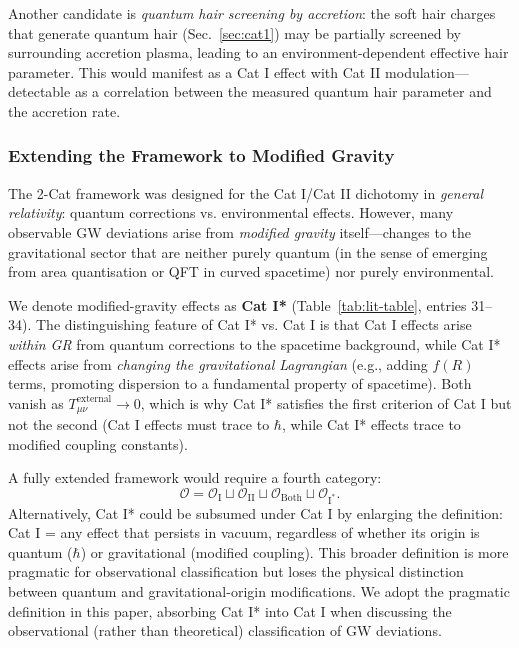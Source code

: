 \documentclass[11pt]{article}
\begin{document}
Another candidate is \emph{quantum hair screening by accretion}: the soft hair charges that generate quantum hair (Sec.~\ref{sec:cat1}) may be partially screened by surrounding accretion plasma, leading to an environment-dependent effective hair parameter. This would manifest as a Cat I effect with Cat II modulation---detectable as a correlation between the measured quantum hair parameter and the accretion rate.

\subsubsection{Extending the Framework to Modified Gravity}

The 2-Cat framework was designed for the Cat I/Cat II dichotomy in \emph{general relativity}: quantum corrections vs. environmental effects. However, many observable GW deviations arise from \emph{modified gravity} itself---changes to the gravitational sector that are neither purely quantum (in the sense of emerging from area quantisation or QFT in curved spacetime) nor purely environmental.

We denote modified-gravity effects as \textbf{Cat I*} (Table~\ref{tab:lit-table}, entries 31--34). The distinguishing feature of Cat I* vs. Cat I is that Cat I effects arise \emph{within GR} from quantum corrections to the spacetime background, while Cat I* effects arise from \emph{changing the gravitational Lagrangian} (e.g., adding $f(R)$ terms, promoting dispersion to a fundamental property of spacetime). Both vanish as $T^{\mathrm{external}}_{\mu\nu} \to 0$, which is why Cat I* satisfies the first criterion of Cat I but not the second (Cat I effects must trace to $\hbar$, while Cat I* effects trace to modified coupling constants).

A fully extended framework would require a fourth category:
\[
\mathcal{O} = \mathcal{O}_{\mathrm{I}} \sqcup \mathcal{O}_{\mathrm{II}} \sqcup \mathcal{O}_{\mathrm{Both}} \sqcup \mathcal{O}_{\mathrm{I}^*}.
\]
Alternatively, Cat I* could be subsumed under Cat I by enlarging the definition: Cat I = any effect that persists in vacuum, regardless of whether its origin is quantum ($\hbar$) or gravitational (modified coupling). This broader definition is more pragmatic for observational classification but loses the physical distinction between quantum and gravitational-origin modifications. We adopt the pragmatic definition in this paper, absorbing Cat I* into Cat I when discussing the observational (rather than theoretical) classification of GW deviations.
\end{document}
